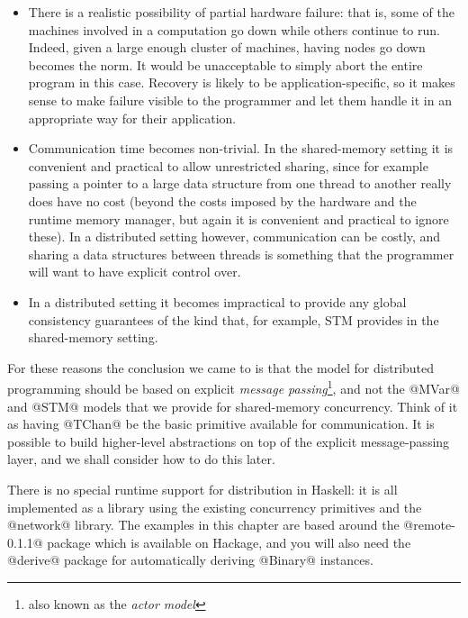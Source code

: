 \begin{itemize}
\item There is a realistic possibility of partial hardware failure:
  that is, some of the machines involved in a computation go down
  while others continue to run.  Indeed, given a large enough cluster
  of machines, having nodes go down becomes the norm.  It would be
  unacceptable to simply abort the entire program in this case.
  Recovery is likely to be application-specific, so it makes sense to
  make failure visible to the programmer and let them handle it in an
  appropriate way for their application.

\item Communication time becomes non-trivial.  In the shared-memory
  setting it is convenient and practical to allow unrestricted
  sharing, since for example passing a pointer to a large data
  structure from one thread to another really does have no cost
  (beyond the costs imposed by the hardware and the runtime memory
  manager, but again it is convenient and practical to ignore these).
  In a distributed setting however, communication can be costly, and
  sharing a data structures between threads is something that the
  programmer will want to have explicit control over.

\item In a distributed setting it becomes impractical to provide any
  global consistency guarantees of the kind that, for example, STM
  provides in the shared-memory setting.
\end{itemize}

For these reasons the conclusion we came to is that the model for
distributed programming should be based on explicit \emph{message
  passing}\footnote{also known as the \emph{actor model}}, and not the @MVar@ and @STM@ models that we provide for
shared-memory concurrency.  Think of it as having @TChan@ be the basic
primitive available for communication.  It is possible to build
higher-level abstractions on top of the explicit message-passing
layer, and we shall consider how to do this later.


There is no special runtime support for distribution in Haskell: it is
all implemented as a library using the existing concurrency
primitives and the @network@ library.  The examples in this chapter
are based around the @remote-0.1.1@ package which is available on
Hackage, and you will also need the @derive@ package for automatically
deriving @Binary@ instances.

